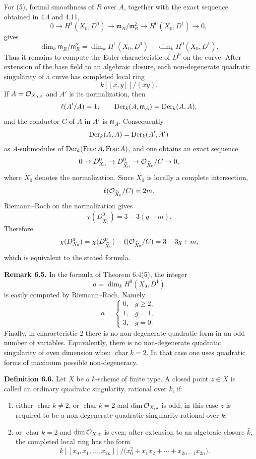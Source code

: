 \documentclass[11pt]{article}
\begin{document}
For (5), formal smoothness of \(R\) over \(A\), together with the exact sequence obtained in 4.4 and 4.11,
\[
        0\to H^1(X_0,D^0)\to \mathfrak m_R/\mathfrak m_R^2
        \to H^0(X_0,D^1)\to 0,
\]
gives
\[
        \dim_k\mathfrak m_R/\mathfrak m_R^2
        =
        \dim_k H^1(X_0,D^0)+\dim_kH^0(X_0,D^1).
\]
Thus it remains to compute the Euler characteristic of \(D^0\) on the curve.  After extension of the base field to an algebraic closure, each non-degenerate quadratic singularity of a curve has completed local ring
\[
        k[[x,y]]/(xy).
\]
If \(A=\mathcal O_{X_0,z}\) and \(A'\) is its normalization, then
\[
        \ell(A'/A)=1,\qquad
        \operatorname{Der}_k(A,\mathfrak m_A)=\operatorname{Der}_k(A,A),
\]
and the conductor \(C\) of \(A\) in \(A'\) is \(\mathfrak m_A\).  Consequently
\[
        \operatorname{Der}_k(A,A)=\operatorname{Der}_k(A',A')
\]
as \(A\)-submodules of \(\operatorname{Der}_k(\operatorname{Frac} A,\operatorname{Frac} A)\), and one obtains an exact sequence
\[
        0\to D^0_{X_0}
        \to D^0_{\widetilde X_0}
        \to \mathcal O_{\widetilde X_0}/C
        \to 0,
\]
where \(\widetilde X_0\) denotes the normalization.  Since \(X_0\) is locally a complete intersection,
\[
        \ell(\mathcal O_{\widetilde X_0}/C)=2m.
\]
Riemann--Roch on the normalization gives
\[
        \chi(D^0_{\widetilde X_0})=3-3(g-m).
\]
Therefore
\[
        \chi(D^0_{X_0})
        =
        \chi(D^0_{\widetilde X_0})-\ell(\mathcal O_{\widetilde X_0}/C)
        =
        3-3g+m,
\]
which is equivalent to the stated formula.

\textbf{Remark 6.5.}  In the formula of Theorem 6.4(5), the integer
\[
        a=\dim_k H^0(X_0,D^1)
\]
is easily computed by Riemann--Roch.  Namely
\[
        a=
        \begin{cases}
        0,& g\geq 2,\\
        1,& g=1,\\
        3,& g=0.
        \end{cases}
\]
Finally, in characteristic \(2\) there is no non-degenerate quadratic form in an odd number of variables.  Equivalently, there is no non-degenerate quadratic singularity of even dimension when \(\operatorname{char}k=2\).  In that case one uses quadratic forms of maximum possible non-degeneracy.

\textbf{Definition 6.6.}  Let \(X\) be a \(k\)-scheme of finite type.  A closed point \(z\in X\) is called an ordinary quadratic singularity, rational over \(k\), if:
\begin{enumerate}[label=(\roman*)]
\item either \(\operatorname{char}k\neq 2\), or \(\operatorname{char}k=2\) and \(\dim\mathcal O_{X,z}\) is odd; in this case \(z\) is required to be a non-degenerate quadratic singularity rational over \(k\);
\item or \(\operatorname{char}k=2\) and \(\dim\mathcal O_{X,z}\) is even; after extension to an algebraic closure \(\bar k\), the completed local ring has the form
\[
        \bar k[[x_0,x_1,\ldots,x_{2n}]]
        /\bigl(x_0^2+x_1x_2+\cdots+x_{2n-1}x_{2n}\bigr).
\]
\end{enumerate}
\end{document}
